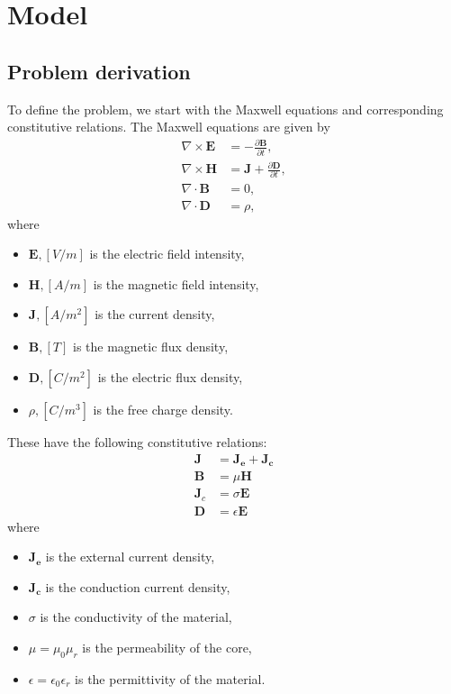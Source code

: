 \chapter{Model}


\section{Problem derivation}

To define the problem, we start with the Maxwell equations and corresponding constitutive relations. The Maxwell equations are given by
\begin{align*}
    \nabla \times \mathbf{E} &= -\frac{\partial \mathbf{B}}{\partial t}, \\
    \nabla \times \mathbf{H} &=  \mathbf{J} + \frac{\partial \mathbf{D}}{\partial t}, \\
    \nabla \cdot \mathbf{B} &= 0, \\
    \nabla \cdot \mathbf{D} &= \rho,
\end{align*}
where
\begin{itemize}
    \item $\mathbf{E}, [V/m]$ is the electric field intensity,
    \item $\mathbf{H}, [A/m]$ is the magnetic field intensity,
    \item $\mathbf{J}, [A/m^2]$ is the current density,
    \item $\mathbf{B}, [T]$ is the magnetic flux density,
    \item $\mathbf{D}, [C/m^2]$ is the electric flux density,
    \item $\rho, [C/m^3]$ is the free charge density.
\end{itemize}

These have the following constitutive relations:
\begin{align*}
    \mathbf{J} &= \mathbf{J_e} + \mathbf{J_c} \\
    \mathbf{B} &= \mu\mathbf{H} \\
    \mathbf{J}_c &= \sigma\mathbf E \\
    \mathbf{D} &= \epsilon \mathbf E
\end{align*}
where
\begin{itemize}
    \item $\mathbf{J_e}$ is the external current density,
    \item $\mathbf{J_c}$ is the conduction current density,
    \item $\sigma$ is the conductivity of the material,
    \item $\mu = \mu_0\mu_r$ is the permeability of the core,
    \item $\epsilon = \epsilon_0\epsilon_r$ is the permittivity of the material.
\end{itemize}

